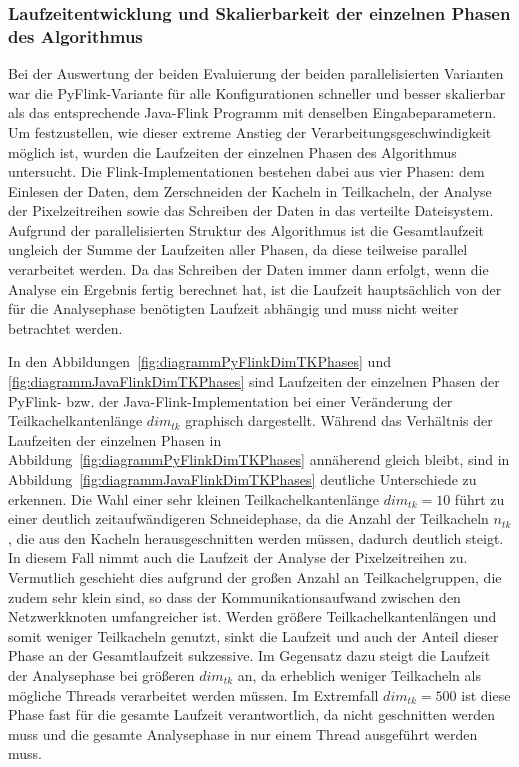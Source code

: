 \subsubsection{Laufzeitentwicklung und Skalierbarkeit der einzelnen Phasen des Algorithmus}
Bei der Auswertung der beiden Evaluierung der beiden parallelisierten Varianten war die PyFlink-Variante für alle Konfigurationen schneller und besser skalierbar als das entsprechende Java-Flink Programm mit denselben Eingabeparametern. Um  festzustellen, wie dieser extreme Anstieg der Verarbeitungsgeschwindigkeit möglich ist, wurden die Laufzeiten der einzelnen Phasen des Algorithmus untersucht. Die Flink-Implementationen bestehen dabei aus vier Phasen: dem Einlesen der Daten, dem Zerschneiden der Kacheln in Teilkacheln, der Analyse der Pixelzeitreihen sowie das Schreiben der Daten in das verteilte Dateisystem. Aufgrund der parallelisierten Struktur des Algorithmus ist die Gesamtlaufzeit ungleich der Summe der Laufzeiten aller Phasen, da diese teilweise parallel verarbeitet werden. Da das Schreiben der Daten immer dann erfolgt, wenn die Analyse ein Ergebnis fertig berechnet hat, ist die Laufzeit hauptsächlich von der für die Analysephase benötigten Laufzeit abhängig und muss nicht weiter betrachtet werden.

In den Abbildungen~\ref{fig:diagrammPyFlinkDimTKPhases} und \ref{fig:diagrammJavaFlinkDimTKPhases} sind Laufzeiten der einzelnen Phasen der PyFlink- bzw. der Java-Flink-Implementation bei einer Veränderung der Teilkachelkantenlänge $dim_{tk}$ graphisch dargestellt. Während das Verhältnis der Laufzeiten der einzelnen Phasen in Abbildung~\ref{fig:diagrammPyFlinkDimTKPhases} annäherend gleich bleibt, sind in Abbildung~\ref{fig:diagrammJavaFlinkDimTKPhases} deutliche Unterschiede zu erkennen. Die Wahl einer sehr kleinen Teilkachelkantenlänge $dim_{tk} = 10$ führt zu einer deutlich zeitaufwändigeren Schneidephase, da die Anzahl der Teilkacheln $n_{tk}$, die aus den Kacheln herausgeschnitten werden müssen, dadurch deutlich steigt. In diesem Fall nimmt auch die Laufzeit der Analyse der Pixelzeitreihen zu. Vermutlich geschieht dies aufgrund der großen Anzahl an Teilkachelgruppen, die zudem sehr klein sind, so dass der Kommunikationsaufwand zwischen den Netzwerkknoten umfangreicher ist. Werden größere Teilkachelkantenlängen und somit weniger Teilkacheln genutzt, sinkt die Laufzeit und auch der Anteil dieser Phase an der Gesamtlaufzeit sukzessive. Im Gegensatz dazu steigt die Laufzeit der Analysephase bei größeren $dim_{tk}$ an, da erheblich weniger Teilkacheln als mögliche Threads verarbeitet werden müssen. Im Extremfall $dim_{tk}=500$ ist diese Phase fast für die gesamte Laufzeit verantwortlich, da nicht geschnitten werden muss und die gesamte Analysephase in nur einem Thread ausgeführt werden muss. 

